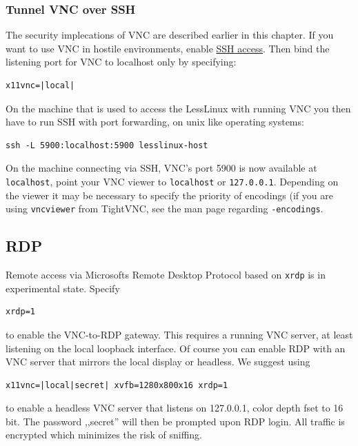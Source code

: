 \subsubsection{Tunnel VNC over SSH}

The security implecations of VNC are described earlier in this chapter. If you want to use VNC in hostile environments, enable  \hyperlink{ssh}{SSH access}. Then bind the listening port for VNC to localhost only by specifying:

\begin{verbatim}
x11vnc=|local|
\end{verbatim}

On the machine that is used to access the LessLinux with running VNC you then have to run SSH with port forwarding, on unix like operating systems:

\begin{verbatim}
ssh -L 5900:localhost:5900 lesslinux-host
\end{verbatim}

On the machine connecting via SSH, VNC's port 5900 is now available at \texttt{localhost}, point your VNC viewer to \texttt{localhost} or \texttt{127.0.0.1}. Depending on the viewer it may be necessary to specify the priority of encodings (if you are using \texttt{vncviewer} from TightVNC, see the man page regarding \texttt{-encodings}.

\subsection{RDP}

Remote access via Microsofts Remote Desktop Protocol  based on \texttt{xrdp} is in experimental state. Specify 

\begin{verbatim}
xrdp=1
\end{verbatim}

to enable the VNC-to-RDP gateway. This requires a running VNC server, at least listening on the local loopback interface. Of course you can enable RDP with an VNC server that mirrors the local display or headless. We suggest using

\begin{verbatim}
x11vnc=|local|secret| xvfb=1280x800x16 xrdp=1
\end{verbatim}

to enable a headless VNC server that listens on 127.0.0.1, color depth fset to 16 bit. The password ,,secret'' will then be prompted upon RDP login. All traffic is encrypted which minimizes the risk of sniffing.

